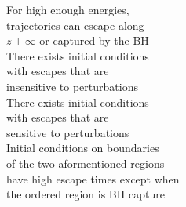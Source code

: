 \documentclass[preview]{standalone}
\begin{document}
For high enough energies,\\trajectories can escape along\\$z\pm\infty$ or captured by the BH\\There exists initial conditions\\with escapes that are\\insensitive to perturbations\\There exists initial conditions\\with escapes that are\\sensitive to perturbations\\Initial conditions on boundaries\\of the two aformentioned regions\\have high escape times except when\\the ordered region is BH capture\\
\end{document}
